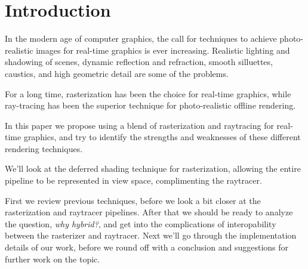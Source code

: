 
\part{Introduction}

In the modern age of computer graphics, the call for techniques to achieve photo-realistic images for real-time graphics is ever increasing. Realistic lighting and shadowing of scenes, dynamic reflection and refraction, smooth silluettes, caustics, and high geometric detail are some of the problems.

For a long time, rasterization has been the choice for real-time graphics, while ray-tracing has been the superior technique for photo-realistic offline rendering.

In this paper we propose using a blend of rasterization and raytracing for real-time graphics, and try to identify the strengths and weaknesses of these different rendering techniques.

We'll look at the deferred shading technique for rasterization, allowing the entire pipeline to be represented in view space, complimenting the raytracer.

First we review previous techniques, before we look a bit closer at the rasterization and raytracer pipelines. After that we should be ready to analyze the question, \emph{why hybrid?}, and get into the complications of interopability between the rasterizer and raytracer. Next we'll go through the implementation details of our work, before we round off with a conclusion and suggestions for further work on the topic.